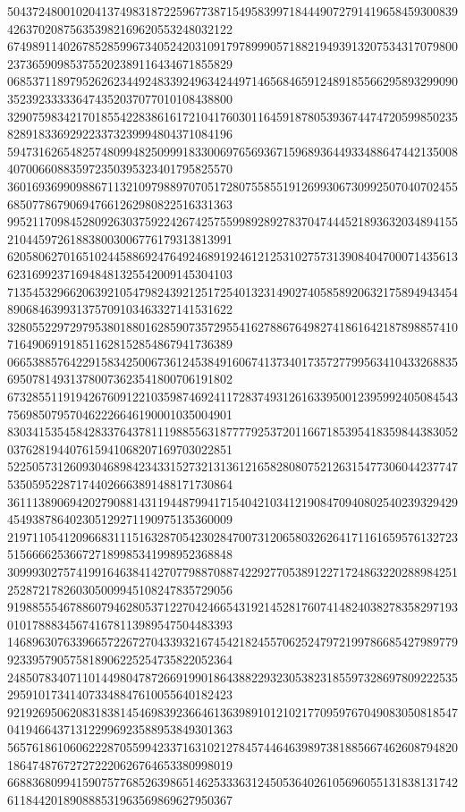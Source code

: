 \begin{DoxyCode}
      504372480010204137498318722596773871549583997184449072791419658459300839426370208756353982169620553248032122
      674989114026785285996734052420310917978999057188219493913207534317079800237365909853755202389116434671855829
      068537118979526262344924833924963424497146568465912489185566295893299090352392333336474352037077010108438800
      329075983421701855422838616172104176030116459187805393674474720599850235828918336929223373239994804371084196
      594731626548257480994825099918330069765693671596893644933488647442135008407006608835972350395323401795825570
      360169369909886711321097988970705172807558551912699306730992507040702455685077867906947661262980822516331363
      995211709845280926303759224267425755998928927837047444521893632034894155210445972618838003006776179313813991
      620580627016510244588692476492468919246121253102757313908404700071435613623169923716948481325542009145304103
      713545329662063921054798243921251725401323149027405858920632175894943454890684639931375709103463327141531622
      328055229729795380188016285907357295541627886764982741861642187898857410716490691918511628152854867941736389
      066538857642291583425006736124538491606741373401735727799563410433268835695078149313780073623541800706191802
      673285511919426760912210359874692411728374931261633950012395992405084543756985079570462226646190001035004901
      830341535458428337643781119885563187777925372011667185395418359844383052037628194407615941068207169703022851
      522505731260930468984234331527321313612165828080752126315477306044237747535059522871744026663891488171730864
      361113890694202790881431194487994171540421034121908470940802540239329429454938786402305129271190975135360009
      219711054120966831115163287054230284700731206580326264171161659576132723515666625366727189985341998952368848
      309993027574199164638414270779887088742292770538912271724863220288984251252872178260305009945108247835729056
      919885554678860794628053712270424665431921452817607414824038278358297193010178883456741678113989547504483393
      146896307633966572267270433932167454218245570625247972199786685427989779923395790575818906225254735822052364
      248507834071101449804787266919901864388229323053823185597328697809222535295910173414073348847610055640182423
      921926950620831838145469839236646136398910121021770959767049083050818547041946643713122996923588953849301363
      565761861060622287055994233716310212784574464639897381885667462608794820186474876727272220626764653380998019
      668836809941590757768526398651462533363124505364026105696055131838131742611844201890888531963569869627950367

\end{DoxyCode}
